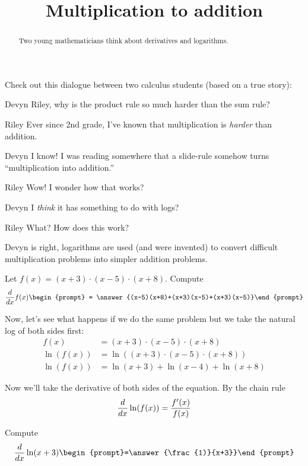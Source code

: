 \documentclass{ximera}
\title[Break-Ground:]{Multiplication to addition}
\begin{document}
\begin{abstract}
Two young mathematicians think about derivatives and logarithms.
\end{abstract}
\maketitle


Check out this dialogue between two calculus students (based on a true
story):

\begin{dialogue}
\item[Devyn] Riley, why is the product rule so much harder than the sum rule?
\item[Riley] Ever since 2nd grade, I've known that multiplication is
  \textit{harder} than addition.
\item[Devyn] I know! I was reading somewhere that a slide-rule somehow
  turns ``multiplication into addition.''
\item[Riley] Wow! I wonder how that works?
\item[Devyn] I \textit{think} it has something to do with logs?
\item[Riley] What? How does this work?
\end{dialogue}

Devyn is right, logarithms are used (and were invented) to convert
difficult multiplication problems into simpler addition problems.

\begin{problem}
  Let $f(x) = (x+3) \cdot (x-5) \cdot (x+8)$. Compute
  \[
  \ddx f(x)\begin{prompt} = \answer{(x-5)(x+8)+(x+3)(x-5)+(x+3)(x-5)}\end{prompt}
  \]
\end{problem}

Now, let's see what happens if we do the same problem but we take the
natural log of both sides first:
\begin{align*}
  f(x) &=(x+3) \cdot (x-5) \cdot (x+8)\\
  \ln(f(x)) &= \ln((x+3) \cdot (x-5) \cdot (x+8))\\
  \ln(f(x)) &=\ln(x+3) + \ln(x-4) + \ln(x+8)
\end{align*}

Now we'll take the derivative of both sides of the equation.
By the chain rule
\[
\frac{d}{\mathop{}\!d x} \ln(f(x))= \frac{f'(x)}{f(x)}
\]


\begin{problem}
  Compute %
  \[
  \ddx \ln(x+3)  \begin{prompt}=\answer{\frac{1)}{x+3}}\end{prompt}
  \]
\end{problem}
\end{document}

